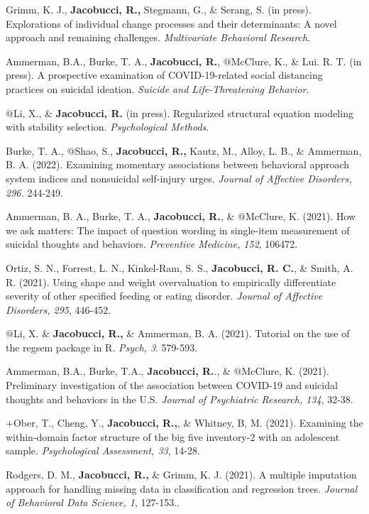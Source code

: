 \documentclass[letterpaper,10pt]{article}
\begin{document}
\begin{etaremune}
	\item Grimm, K. J., \textbf{Jacobucci, R.,} Stegmann, G., \& Serang, S. (in press). Explorations of individual change processes and their determinants: A novel approach and remaining challenges. \emph{Multivariate Behavioral Research}.
	\item Ammerman, B.A., Burke, T. A., \textbf{Jacobucci, R.}, $@$McClure, K., \& Lui. R. T. (in press). A prospective examination of COVID-19-related social distancing practices on suicidal ideation. \emph{Suicide and Life-Threatening Behavior}.
	\item $@$Li, X., \& \textbf{Jacobucci, R.} (in press). Regularized structural equation modeling with stability selection. \emph{Psychological Methods}.
	\item Burke, T. A., $@$Shao, S., \textbf{Jacobucci, R.,} Kautz, M., Alloy, L. B., \& Ammerman, B. A. (2022). Examining momentary associations between behavioral approach system indices and nonsuicidal self-injury urges. \emph{Journal of Affective Disorders, 296.} 244-249.
	\item Ammerman, B. A., Burke, T. A., \textbf{Jacobucci, R.}, \& $@$McClure, K. (2021). How we ask matters: The impact of question wording in single-item measurement of suicidal thoughts and behaviors. \emph{Preventive Medicine, 152}, 106472.
	\item Ortiz, S. N., Forrest, L. N., Kinkel-Ram, S. S., \textbf{Jacobucci, R. C.}, \& Smith, A. R. (2021). Using shape and weight overvaluation to empirically differentiate severity of other specified feeding or eating disorder. \emph{Journal of Affective Disorders, 295}, 446-452.
	\item $@$Li, X. \& \textbf{Jacobucci, R.,} \& Ammerman, B. A. (2021). Tutorial on the use of the regsem package in R. \emph{Psych, 3}. 579-593.
		\item Ammerman, B.A., Burke, T.A., \textbf{Jacobucci, R.}., \& $@$McClure, K. (2021). Preliminary investigation of the association between COVID-19 and suicidal thoughts and behaviors in the U.S. \emph{Journal of Psychiatric Research, 134}, 32-38.
	\item $+$Ober, T., Cheng, Y., \textbf{Jacobucci, R.,}, \& Whitney, B, M. (2021). Examining the within-domain factor structure of the big five inventory-2 with an adolescent sample. \emph{Psychological Assessment, 33}, 14-28.
		\item Rodgers, D. M., \textbf{Jacobucci, R.,} \& Grimm, K. J. (2021). A multiple imputation approach for handling missing data in classification and regression trees. \emph{Journal of Behavioral Data Science, 1}, 127-153..

\end{etaremune}
\end{document}
